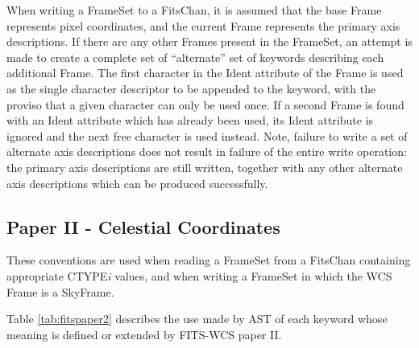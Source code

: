 \documentclass[twoside,11pt]{starlink}
\begin{document}
When writing a FrameSet to a FitsChan, it is assumed that the base Frame
represents pixel coordinates, and the current Frame represents the
primary axis descriptions. If there are any other Frames present in the
FrameSet, an attempt is made to create a complete set of ``alternate''
set of keywords describing each additional Frame. The first character in
the Ident attribute of the Frame is used as the single character
descriptor to be appended to the keyword, with the proviso that a given
character can only be used once. If a second Frame is found with an Ident
attribute which has already been used, its Ident attribute is ignored and
the next free character is used instead. Note, failure to write a set of
alternate axis descriptions does not result in failure of the entire
write operation: the primary axis descriptions are still written,
together with any other alternate axis descriptions which can be produced
successfully.

\subsection{Paper II - Celestial Coordinates}
These conventions are used when reading a FrameSet
from a FitsChan containing appropriate CTYPE\emph{i}
values, and when writing a FrameSet in which the WCS Frame
is a SkyFrame.

Table \ref{tab:fitspaper2} describes the use made by AST of each keyword
whose meaning is defined or extended by FITS-WCS paper II.
\end{document}
